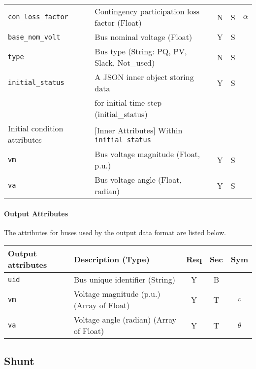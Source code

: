 \documentclass{article}
\begin{document}
\begin{center}
\begin{tabular}{ l | l | c | c | c |}
  \hline
  {\tt con\_loss\_factor} & Contingency participation loss factor (Float) & N & S & $\alpha$\\
  {\tt base\_nom\_volt} & Bus nominal voltage (Float) &  Y & S & \\
  {\tt type} & Bus type (String: PQ, PV, Slack, Not\_used) & N & S &\\
  {\tt initial\_status} & A JSON inner object storing data  & Y & S &  \\
       & for initial time step (initial\_status) &  &  &  \\
  \hline
  Initial condition attributes & [Inner Attributes] Within {\tt initial\_status} & & & \\
  \hline
  {\tt vm}   & Bus voltage magnitude (Float, p.u.) & Y & S & \\
  {\tt va}   & Bus voltage angle     (Float, radian) & Y & S & \\
  \hline
\end{tabular}
\end{center}\textbf{}
\paragraph{Output Attributes} The attributes for buses used by the output data format are listed below.

\begin{center}
\small
\begin{tabular}{ l | l | c | c | c |}
Output attributes & Description (Type) & Req & Sec & Sym\\
\hline
  {\tt uid} & Bus unique identifier (String) & Y & B & \\
  
  {\tt vm} & Voltage magnitude (p.u.) (Array of Float)  & Y & T & $v$ \\
  {\tt va} & Voltage angle (radian) (Array of Float)  & Y & T & $\theta$\\
\hline
\end{tabular}
\end{center}



\subsection{Shunt}
\label{nom:shunt}
\end{document}
